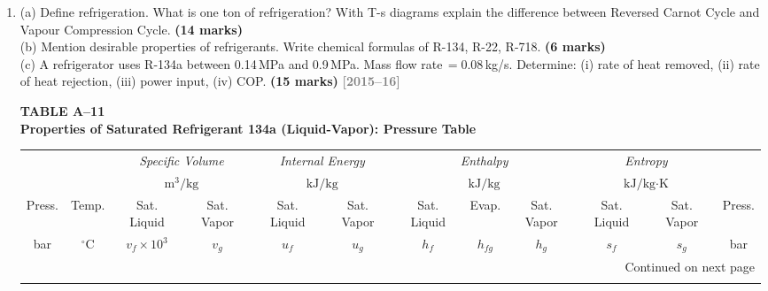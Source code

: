\documentclass[12pt,a3paper]{article}
\newcommand{\yr}[1]{\hfill\textcolor{gray}{\small\textbf{[#1]}}}
\newcommand{\mk}[1]{\textcolor{orange!70!black}{\small\textbf{(#1 marks)}}}
\begin{document}
\begin{enumerate}
\begin{tcolorbox}[enhanced,breakable,ansbox,colback=cC!4,colframe=cC,
  boxrule=0.8pt,arc=5pt,
  title={\textbf{Answer}},fonttitle=\bfseries\color{white},colbacktitle=cC]
\end{tcolorbox}

\item \label{qlabel:A3-Q27}
(a) Define refrigeration. What is one ton of refrigeration? With T-s diagrams explain the difference between Reversed Carnot Cycle and Vapour Compression Cycle. \mk{14}\\
(b) Mention desirable properties of refrigerants. Write chemical formulas of R-134, R-22, R-718. \mk{6}\\
(c) A refrigerator uses R-134a between 0.14\,MPa and 0.9\,MPa. Mass flow rate\,$= 0.08$\,kg/s. Determine: (i) rate of heat removed, (ii) rate of heat rejection, (iii) power input, (iv) COP. \mk{15}
\yr{2015--16}


\noindent\textbf{\Large TABLE A--11} \\
\noindent\textbf{\large Properties of Saturated Refrigerant 134a (Liquid-Vapor): Pressure Table}
\vspace{0.3cm}

\begin{center}
\small
\begin{longtable}{c c c c c c c c c c c c}
\toprule\toprule
& & \multicolumn{2}{c}{\textit{Specific Volume}} & \multicolumn{2}{c}{\textit{Internal Energy}} & \multicolumn{3}{c}{\textit{Enthalpy}} & \multicolumn{2}{c}{\textit{Entropy}} & \\
& & \multicolumn{2}{c}{$\text{m}^3\text{/kg}$} & \multicolumn{2}{c}{$\text{kJ/kg}$} & \multicolumn{3}{c}{$\text{kJ/kg}$} & \multicolumn{2}{c}{$\text{kJ/kg}\cdot\text{K}$} & \\
\cmidrule(lr){3-4} \cmidrule(lr){5-6} \cmidrule(lr){7-9} \cmidrule(lr){10-11}
Press. & Temp. & Sat. Liquid & Sat. Vapor & Sat. Liquid & Sat. Vapor & Sat. Liquid & Evap. & Sat. Vapor & Sat. Liquid & Sat. Vapor & Press. \\
bar & $^\circ\text{C}$ & $v_f \times 10^3$ & $v_g$ & $u_f$ & $u_g$ & $h_f$ & $h_{fg}$ & $h_g$ & $s_f$ & $s_g$ & bar \\
\midrule
\endhead

\midrule
\multicolumn{12}{r}{{Continued on next page}} \\
\bottomrule
\endfoot

\bottomrule\bottomrule
\endlastfoot


\end{longtable}
\end{center}
\end{enumerate}
\end{document}
